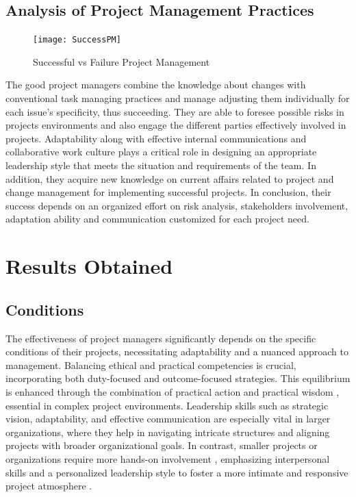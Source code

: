 \documentclass{article}
\begin{document}
\subsection{Analysis of Project Management Practices}
\begin{figure}[htp]
    \centering
    \texttt{[image: SuccessPM]}
    \caption{Successful vs Failure Project Management}
    \label{fig:SuccessPM}
\end{figure}
The good project managers combine the knowledge about changes with conventional task managing practices and manage adjusting them individually for each issue’s specificity, thus succeeding. They are able to foresee possible risks in projects environments and also engage the different parties effectively involved in projects. Adaptability along with effective internal communications and collaborative work culture plays a critical role in designing an appropriate leadership style that meets the situation and requirements of the team. In addition, they acquire new knowledge on current affairs related to project and change management for implementing successful projects. In conclusion, their success depends on an organized effort on risk analysis, stakeholders involvement, adaptation ability and communication customized for each project need.\cite{pollack2016project}


\section{Results Obtained}
\subsection{Conditions}

The effectiveness of project managers significantly depends on the specific conditions of their projects, necessitating adaptability and a nuanced approach to management. Balancing ethical and practical competencies is crucial, incorporating both duty-focused and outcome-focused strategies. This equilibrium is enhanced through the combination of practical action and practical wisdom \cite{bredillet2015good}, essential in complex project environments. Leadership skills such as strategic vision, adaptability, and effective communication are especially vital in larger organizations, where they help in navigating intricate structures and aligning projects with broader organizational goals. In contrast, smaller projects or organizations require more hands-on involvement \cite{sigurdhssonpatterns}, emphasizing interpersonal skills and a personalized leadership style to foster a more intimate and responsive project atmosphere \cite{pollack2016project}.
\end{document}
